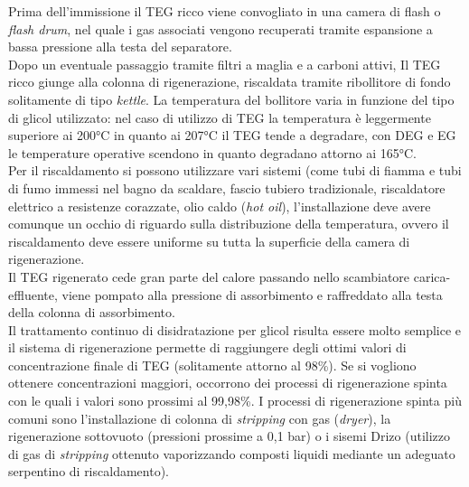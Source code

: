Prima dell'immissione il TEG ricco viene convogliato in una camera di flash o \textit{flash drum}, nel quale i gas associati vengono recuperati tramite espansione a bassa pressione alla testa del separatore. \\
Dopo un eventuale passaggio tramite filtri a maglia e a carboni attivi, Il TEG ricco giunge alla colonna di rigenerazione, riscaldata tramite ribollitore di fondo solitamente di tipo \textit{kettle}. La temperatura del bollitore varia in funzione del tipo di glicol utilizzato: nel caso di utilizzo di TEG la temperatura è leggermente superiore ai 200°C in quanto ai 207°C il TEG tende a degradare, con DEG e EG le temperature operative scendono in quanto degradano attorno ai 165°C.\\
Per il riscaldamento si possono utilizzare vari sistemi (come tubi di fiamma e tubi di fumo immessi nel bagno da scaldare, fascio tubiero tradizionale, riscaldatore elettrico a resistenze corazzate, olio caldo (\textit{hot oil}), l'installazione deve avere comunque un occhio di riguardo sulla distribuzione della temperatura, ovvero il riscaldamento deve essere uniforme su tutta la superficie della camera di rigenerazione. \\
Il TEG rigenerato cede gran parte del calore passando nello scambiatore carica-effluente, viene pompato alla pressione di assorbimento e raffreddato alla testa della colonna di assorbimento.\\
Il trattamento continuo di disidratazione per glicol risulta essere molto semplice e il sistema di rigenerazione permette di raggiungere degli ottimi valori di concentrazione finale di TEG (solitamente attorno  al 98\%). Se si vogliono ottenere concentrazioni maggiori, occorrono dei processi di rigenerazione spinta con le quali i valori sono prossimi al 99,98\%. I processi di rigenerazione spinta più comuni sono l'installazione di colonna di \textit{stripping} con gas (\textit{dryer}), la rigenerazione sottovuoto (pressioni prossime a 0,1 bar) o i sisemi Drizo (utilizzo di gas di \textit{stripping} ottenuto vaporizzando composti liquidi mediante un adeguato serpentino di riscaldamento).

